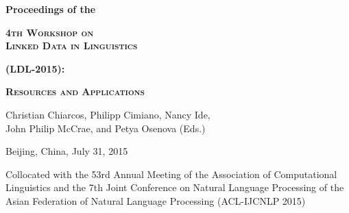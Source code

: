 


\begin{center}

\begin{spacing}{2.0}

{\Large \textbf{Proceedings of the}}

{\Huge \textbf{\textsc{4th Workshop on \\ Linked Data in Linguistics }}}

{\Huge \textbf{\textsc{(LDL-2015):}}}

\vspace{5mm}


{\huge \textbf{\textsc{Resources and Applications}}}



\vspace{40mm}
{\Large

Christian Chiarcos, Philipp Cimiano, Nancy Ide, \\
John Philip McCrae, and Petya Osenova (Eds.)
}

\vspace{45mm}




{\Large Beijing, China, July 31, 2015}

\vspace{1cm}
\end{spacing}

{\large
Collocated with the 53rd Annual Meeting of the Association of Computational Linguistics and the 7th Joint Conference on Natural Language Processing of the Asian Federation of Natural Language Processing (ACL-IJCNLP 2015)
}


\end{center}
